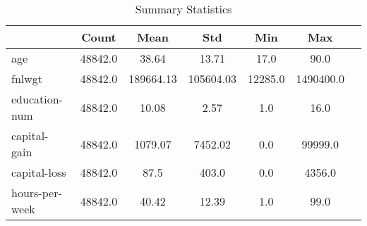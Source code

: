 \begin{table}[ht]
\centering
\caption{Summary Statistics}
\label{tab:summary_stats}
\begin{tabular}{lcccccc}
\toprule
 & \textbf{Count} & \textbf{Mean} & \textbf{Std} & \textbf{Min} & \textbf{Max} \\
\midrule
age & 48842.0 & 38.64 & 13.71 & 17.0 & 90.0 \\
fnlwgt & 48842.0 & 189664.13 & 105604.03 & 12285.0 & 1490400.0 \\
education-num & 48842.0 & 10.08 & 2.57 & 1.0 & 16.0 \\
capital-gain & 48842.0 & 1079.07 & 7452.02 & 0.0 & 99999.0 \\
capital-loss & 48842.0 & 87.5 & 403.0 & 0.0 & 4356.0 \\
hours-per-week & 48842.0 & 40.42 & 12.39 & 1.0 & 99.0 \\
\bottomrule
\end{tabular}
\end{table}
